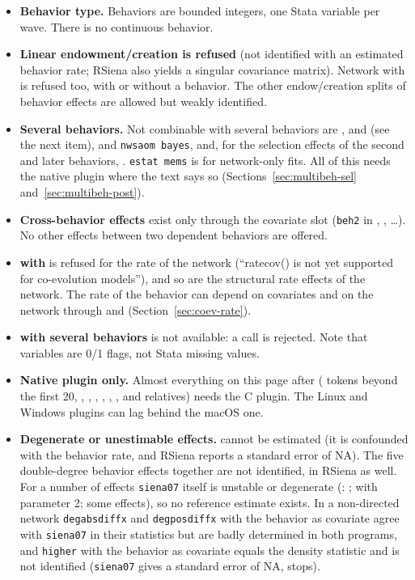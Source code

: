 \begin{itemize}
\item \textbf{Behavior type.} Behaviors are bounded integers, one Stata variable per wave. There is no continuous behavior.
\item \textbf{Linear endowment/creation is refused} (not identified with an estimated behavior rate; RSiena also yields a singular covariance matrix). Network  with  is refused too, with or without a behavior. The other endow/creation splits of behavior effects are allowed but weakly identified.
\item \textbf{Several behaviors.} Not combinable with several behaviors are ,  and  (see the next item),  and \texttt{nwsaom bayes}, and, for the selection effects of the second and later behaviors, . \texttt{estat mems} is for network-only fits. All of this needs the native plugin where the text says so (Sections~\ref{sec:multibeh-sel} and~\ref{sec:multibeh-post}).
\item \textbf{Cross-behavior effects} exist only through the covariate slot (\texttt{beh2} in , ,  \dots). No other effects between two dependent behaviors are offered.
\item \textbf{ with } is refused for the rate of the network (``ratecov() is not yet supported for co-evolution models''), and so are the structural rate effects of the network. The rate of the behavior can depend on covariates and on the network through  and  (Section~\ref{sec:coev-rate}).
\item \textbf{ with several behaviors} is not available: a call  is rejected. Note that  variables are 0/1 flags, not Stata missing values.
\item \textbf{Native plugin only.} Almost everything on this page after  ( tokens beyond the first 20, , , , , , ,  and relatives) needs the C plugin. The Linux and Windows plugins can lag behind the macOS one.
\item \textbf{Degenerate or unestimable effects.}  cannot be estimated (it is confounded with the behavior rate, and RSiena reports a standard error of NA). The five double-degree behavior effects  together are not identified, in RSiena as well. For a number of effects \texttt{siena07} itself is unstable or degenerate (: ;  with parameter 2; some  effects), so no reference estimate exists. In a non-directed network \texttt{degabsdiffx} and \texttt{degposdiffx} with the behavior as covariate agree with \texttt{siena07} in their statistics but are badly determined in both programs, and \texttt{higher} with the behavior as covariate equals the density statistic and is not identified (\texttt{siena07} gives a standard error of NA, \nwsaom{} stops).

\end{itemize}
